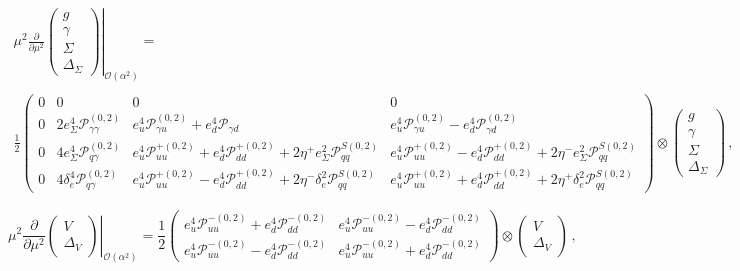 \begin{widetext}
\begin{equation}
\begin{array}{c}
\displaystyle\left.\mu^2\frac{\partial}{\partial \mu^2}
\begin{pmatrix}
g\\
\gamma\\
\Sigma\\
\Delta_\Sigma
\end{pmatrix}
  \right|_{\mathcal{O}(\alpha^2)} =\\
\\
 \displaystyle \frac12\begin{pmatrix}
    0 & 0 & 0 & 0 \\
    0 & 2e_\Sigma^4 \mathcal{P}_{\gamma\gamma}^{(0,2)} & e_u^4 \mathcal{P}_{\gamma
      u}^{(0,2)} + e_d^4 \mathcal{P}_{\gamma d} & e_u^4 \mathcal{P}_{\gamma u}^{(0,2)} - e_d^4 \mathcal{P}_{\gamma d}^{(0,2)}\\
    0 & 4 e_\Sigma^4 \mathcal{P}^{(0,2)}_{q\gamma} &
    e_u^4\mathcal{P}_{uu}^{+(0,2)}
    +e_d^4\mathcal{P}_{dd}^{+(0,2)}+2\eta^+e_\Sigma^2\mathcal{P}^{S(0,2)}_{qq} & e_u^4\mathcal{P}_{uu}^{+(0,2)}-e_d^4\mathcal{P}_{dd}^{+(0,2)} + 2\eta^-e_\Sigma^2\mathcal{P}^{S(0,2)}_{qq}\\
    0 & 4 \delta_e^4 \mathcal{P}^{(0,2)}_{q\gamma} & e_u^4\mathcal{P}_{uu}^{+(0,2)}
    -e_d^4\mathcal{P}_{dd}^{+(0,2)}+2\eta^-\delta_e^2
    \mathcal{P}^{S(0,2)}_{qq} & e_u^4\mathcal{P}_{uu}^{+(0,2)}+e_d^4\mathcal{P}_{dd}^{+(0,2)} + 2\eta^+\delta_e^2 \mathcal{P}^{S(0,2)}_{qq}
\end{pmatrix}\otimes
\begin{pmatrix}
g\\
\gamma\\
\Sigma\\
\Delta_\Sigma
\end{pmatrix}\,,
\end{array}
\end{equation}

\begin{equation}
\displaystyle\left.\mu^2\frac{\partial}{\partial \mu^2}
\begin{pmatrix}
V\\
\Delta_V
\end{pmatrix} \right|_{\mathcal{O}(\alpha^2)}= \frac12
\begin{pmatrix}
e_u^4\mathcal{P}_{uu}^{-(0,2)}+e_d^4\mathcal{P}_{dd}^{-(0,2)} & e_u^4\mathcal{P}_{uu}^{-(0,2)}-e_d^4\mathcal{P}_{dd}^{-(0,2)} \\
e_u^4\mathcal{P}_{uu}^{-(0,2)}-e_d^4\mathcal{P}_{dd}^{-(0,2)} & e_u^4\mathcal{P}_{uu}^{-(0,2)}+e_d^4\mathcal{P}_{dd}^{-(0,2)} 
\end{pmatrix}\otimes
\begin{pmatrix}
V\\
\Delta_V
\end{pmatrix}\,,
\end{equation}


\end{widetext}
